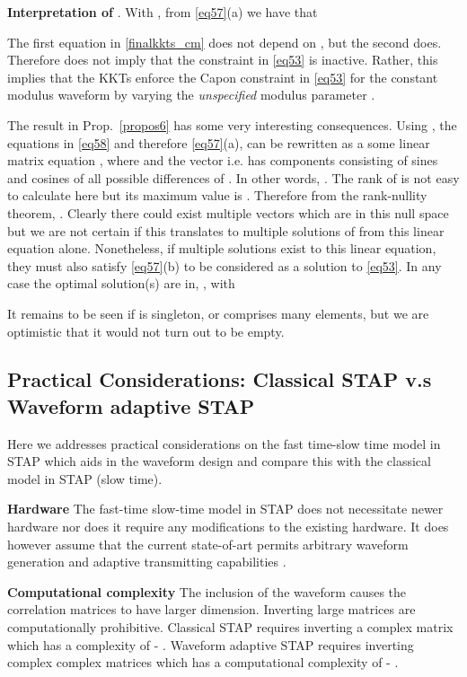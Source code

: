 \documentclass[11pt,draftclsnofoot,onecolumn]{IEEEtran}
\theoremstyle{definition}
\theoremstyle{remark}
\begin{document}
{\bf  Interpretation of }. With , from \eqref{eq57}(a) we have that

The first equation in \eqref{finalkkts_cm} does not depend on , but the second does. Therefore  does not imply that the constraint in \eqref{eq53} is inactive. Rather, this implies that the KKTs enforce the Capon constraint in \eqref{eq53} for the constant modulus waveform by varying the {\it unspecified} modulus parameter . 

The result in Prop.~\ref{propos6} has some very interesting consequences. Using , the  equations in \eqref{eq58} and therefore \eqref{eq57}(a), can be rewritten as a some linear matrix equation , where  and the vector  i.e. has  components consisting of sines and cosines of all possible differences of . In other words, . The rank of  is not easy to calculate here but its maximum value is . Therefore from the rank-nullity theorem, . Clearly there could exist multiple vectors which are in this null space but we are not certain if this translates to multiple solutions of  from this linear equation alone. Nonetheless, if multiple solutions exist to  this linear equation, they must also satisfy \eqref{eq57}(b) to be considered as  a solution to \eqref{eq53}. In any case the optimal solution(s) are in, , with

It remains to be seen if  is  singleton, or comprises many elements, but we are optimistic that it would not turn out to be empty.
\subsection{Practical Considerations: Classical STAP v.s Waveform adaptive STAP}
Here we addresses practical considerations on the fast time-slow time model in STAP which aids in the waveform design and compare this with the classical model in STAP (slow time).

{\bf Hardware} The fast-time slow-time model in STAP does not necessitate newer hardware nor does it require any modifications to the existing hardware. It does however assume that the current state-of-art permits arbitrary waveform generation and adaptive transmitting capabilities \cite{cochran2009waveform}.

{\bf Computational complexity} The inclusion of the waveform causes the correlation matrices to have larger dimension. Inverting large matrices are computationally prohibitive. Classical STAP requires inverting a complex  matrix which has a complexity of - \cite{VirginiaWilliams2012}. Waveform adaptive STAP requires inverting complex  complex matrices which has a computational complexity of - \cite{VirginiaWilliams2012}.
\end{document}
